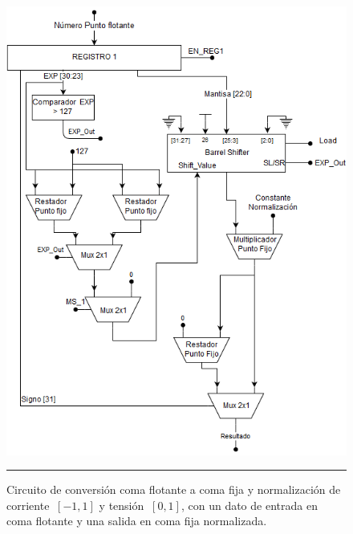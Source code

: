   
  \begin{figure}[H]
  \centering
    \includegraphics[scale=0.11]{./NORMALIZADOR.png}
    \rule{35em}{0.5pt}
  \caption[Circuito de conversión coma flotante a coma fija y normalización de corriente y tensión, con un dato de entrada en coma flotante y una salida en coma fija normalizada]{Circuito de conversión coma flotante a coma fija y normalización de corriente $\ [-1,1] $ y tensión $\ [0,1] $, con un dato de entrada en coma flotante y una salida en coma fija normalizada.}
  \label{fig:NORM}
\end{figure} 


